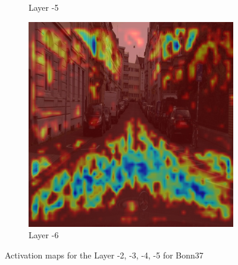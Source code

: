 \begin{figure}
\begin{subfigure}[b]{0.49\textwidth}
        \caption{Layer -5}
        \label{fig:c-5}
    \end{subfigure}
    \hfill
    \begin{subfigure}[b]{0.49\textwidth}
        \centering
        \includegraphics[width=\textwidth]{figures/bonn_000037_000019_leftImg8bit.pnglayer-6/bonn_000037_000019_leftImg8bit.png_object(0)_heatmap}
        \caption{Layer -6}
        \label{fig:c-6}
    \end{subfigure}
    \hfill

    \caption{Activation maps for the Layer -2, -3, -4, -5 for Bonn37}
    \label{fig:Bonn_000037_000019}
\end{figure}
